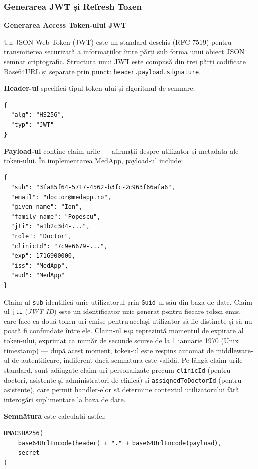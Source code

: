 \documentclass[12pt, a4paper]{report}
\begin{document}
\subsubsection{Generarea JWT și Refresh Token}

\textbf{Generarea Access Token-ului JWT}

Un JSON Web Token (JWT) este un standard deschis (RFC 7519) pentru transmiterea securizată
a informațiilor între părți sub forma unui obiect JSON semnat criptografic. Structura unui
JWT este compusă din trei părți codificate Base64URL și separate prin punct:
\texttt{header.payload.signature}.

\textbf{Header-ul} specifică tipul token-ului și algoritmul de semnare:

\begin{verbatim}
{
  "alg": "HS256",
  "typ": "JWT"
}
\end{verbatim}

\textbf{Payload-ul} conține claim-urile --- afirmații despre utilizator și metadata
ale token-ului. În implementarea MedApp, payload-ul include:

\begin{verbatim}
{
  "sub": "3fa85f64-5717-4562-b3fc-2c963f66afa6",
  "email": "doctor@medapp.ro",
  "given_name": "Ion",
  "family_name": "Popescu",
  "jti": "a1b2c3d4-...",
  "role": "Doctor",
  "clinicId": "7c9e6679-...",
  "exp": 1716900000,
  "iss": "MedApp",
  "aud": "MedApp"
}
\end{verbatim}

Claim-ul \texttt{sub} identifică unic utilizatorul prin \texttt{Guid}-ul său din baza
de date. Claim-ul \texttt{jti} (\textit{JWT ID}) este un identificator unic generat
pentru fiecare token emis, care face ca două token-uri emise pentru același utilizator
să fie distincte și să nu poată fi confundate între ele. Claim-ul \texttt{exp}
reprezintă momentul de expirare al token-ului, exprimat ca număr de secunde scurse
de la 1 ianuarie 1970 (Unix timestamp) --- după acest moment, token-ul este respins
automat de middleware-ul de autentificare, indiferent dacă semnătura este validă.
Pe lângă claim-urile standard, sunt adăugate claim-uri personalizate precum
\texttt{clinicId} (pentru doctori, asistente și administratori de clinică) și
\texttt{assignedToDoctorId} (pentru asistente), care permit handler-elor să determine
contextul utilizatorului fără interogări suplimentare la baza de date.

\textbf{Semnătura} este calculată astfel:

\begin{verbatim}
HMACSHA256(
    base64UrlEncode(header) + "." + base64UrlEncode(payload),
    secret
)
\end{verbatim}
\end{document}
